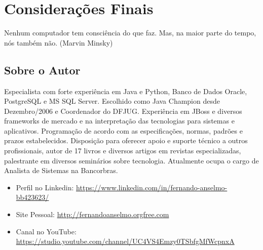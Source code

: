 \documentclass[a4paper,11pt]{book} %
\begin{document}

\pagestyle{empty} %
\tableofcontents %
\cleardoublepage %
\pagestyle{fancy} %
\clearpage %






% 
\appendix
\chapter{Considerações Finais}
\begin{remark}
Nenhum computador tem consciência do que faz. 
Mas, na maior parte do tempo, nós também não. (Marvin Minsky)
\end{remark}

\section{Sobre o Autor}
Especialista com forte experiência em Java e Python, Banco de Dados Oracle, PostgreSQL e MS SQL Server. Escolhido como Java Champion desde Dezembro/2006 e Coordenador do DFJUG. Experiência em JBoss e diversos frameworks de mercado e na interpretação das tecnologias para sistemas e aplicativos. Programação de acordo com as especificações, normas, padrões e prazos estabelecidos. Disposição para oferecer apoio e suporte técnico a outros profissionais, autor de 17 livros e diversos artigos em revistas especializadas, palestrante em diversos seminários sobre tecnologia. Atualmente ocupa o cargo de Analista de Sistemas na Bancorbras.
\begin{itemize}
 \item Perfil no Linkedin: \url{https://www.linkedin.com/in/fernando-anselmo-bb423623/}
 \item Site Pessoal: \url{http://fernandoanselmo.orgfree.com}
 \item Canal no YouTube: \url{https://studio.youtube.com/channel/UC4VS4Emzy0TSbfgMfWcpnxA}
\end{itemize}
\end{document}
